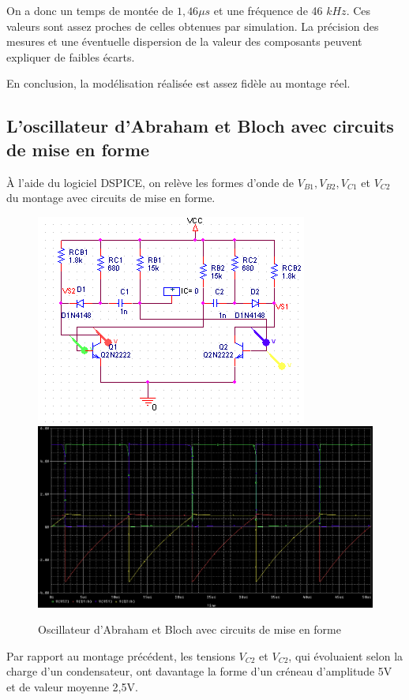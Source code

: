 \documentclass[../../Cours_M1.tex]{subfiles}
\begin{document}
\begin{itemize}
On a donc un temps de montée de $1,46\mu s$ et une fréquence de 46 $kHz$. Ces valeurs sont assez proches de celles obtenues par simulation. La précision des mesures et une éventuelle dispersion de la valeur des composants peuvent expliquer de faibles écarts.

En conclusion, la modélisation réalisée est assez fidèle au montage réel.
\end{itemize}

\newpage
\subsection{L'oscillateur d'Abraham et Bloch avec circuits de mise en forme}
À l'aide du logiciel DSPICE, on relève les formes d'onde de $V_{B1}, V_{B2}, V_{C1}$ et $V_{C2}$ du montage avec circuits de mise en forme.
\begin{figure}[h!]
\centering
\includegraphics[scale=0.8]{AATC/I2sim.PNG}
\includegraphics[scale=0.3]{AATC/I2simfreq.PNG}
\caption{Oscillateur d'Abraham et Bloch avec circuits de mise en forme}
\end{figure}

Par rapport au montage précédent, les tensions $V_{C2}$ et $V_{C2}$, qui évoluaient selon la charge d'un condensateur, ont davantage la forme d'un créneau d'amplitude 5V et de valeur moyenne 2,5V.
\end{document}
